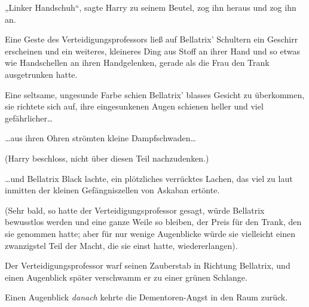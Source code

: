 „Linker Handschuh“, sagte Harry zu seinem Beutel, zog ihn heraus und zog ihn an.

Eine Geste des Verteidigungsprofessors ließ auf Bellatrix’ Schultern ein Geschirr erscheinen und ein weiteres, kleineres Ding aus Stoff an ihrer Hand und so etwas wie Handschellen an ihren Handgelenken, gerade als die Frau den Trank ausgetrunken hatte.

Eine seltsame, ungesunde Farbe schien Bellatrix’ blasses Gesicht zu überkommen, sie richtete sich auf, ihre eingesunkenen Augen schienen heller und viel gefährlicher…

…aus ihren Ohren strömten kleine Dampfschwaden…

(Harry beschloss, nicht über diesen Teil nachzudenken.)

…und Bellatrix Black lachte, ein plötzliches verrücktes Lachen, das viel zu laut inmitten der kleinen Gefängniszellen von Askaban ertönte.

(Sehr bald, so hatte der Verteidigungsprofessor gesagt, würde Bellatrix bewusstlos werden und eine ganze Weile so bleiben, der Preis für den Trank, den sie genommen hatte; aber für nur wenige Augenblicke würde sie vielleicht einen zwanzigstel Teil der Macht, die sie einst hatte, wiedererlangen).

Der Verteidigungsprofessor warf seinen Zauberstab in Richtung Bellatrix, und einen Augenblick später verschwamm er zu einer grünen Schlange.

Einen Augenblick \emph{danach} kehrte die Dementoren-Angst in den Raum zurück.

